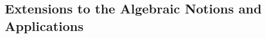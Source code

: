 {\begin{itemize}



\iffalse 

 \subsection{Extensions  to the Algebraic Notions and Applications} \label{sec-know}





\end{itemize}}
